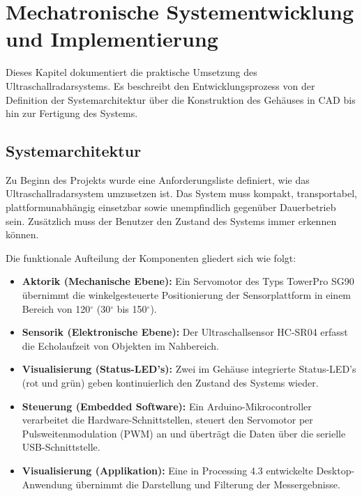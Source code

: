 %
%
%


\chapter{Mechatronische Systementwicklung und Implementierung}
\label{chap:Development_Umsetzung}

Dieses Kapitel dokumentiert die praktische Umsetzung des Ultraschallradarsystems. Es beschreibt den Entwicklungsprozess von der Definition der Systemarchitektur über die Konstruktion des Gehäuses in CAD bis hin zur  Fertigung des Systems.

\section{Systemarchitektur}
\label{sec:Systemarchitektur_Workflow}

Zu Beginn des Projekts wurde eine  Anforderungsliste definiert, wie das Ultraschallradarsystem umzusetzen ist. Das System muss kompakt, transportabel, plattformunabhängig einsetzbar sowie unempfindlich gegenüber Dauerbetrieb sein. Zusätzlich muss der Benutzer den Zustand des Systems immer erkennen können.

Die funktionale Aufteilung der Komponenten gliedert sich wie folgt:
\begin{itemize}
	\item \textbf{Aktorik (Mechanische Ebene):} Ein Servomotor des Typs TowerPro SG90 übernimmt die winkelgesteuerte Positionierung der Sensorplattform in einem Bereich von 120$^\circ$ (30$^\circ$ bis 150$^\circ$).
	\item \textbf{Sensorik (Elektronische Ebene):} Der Ultraschallsensor HC-SR04 erfasst die Echolaufzeit von Objekten im Nahbereich.
	\item \textbf{Visualisierung (Status-LED's):} Zwei im Gehäuse integrierte Status-LED's (rot und grün) geben kontinuierlich den Zustand des Systems wieder.
	\item \textbf{Steuerung (Embedded Software):} Ein Arduino-Mikrocontroller verarbeitet die Hardware-Schnittstellen, steuert den Servomotor per Pulsweitenmodulation (PWM) an und überträgt die Daten über die serielle USB-Schnittstelle.
	\item \textbf{Visualisierung (Applikation):} Eine in Processing 4.3 entwickelte Desktop-Anwendung übernimmt die Darstellung und Filterung der Messergebnisse.
\end{itemize}

